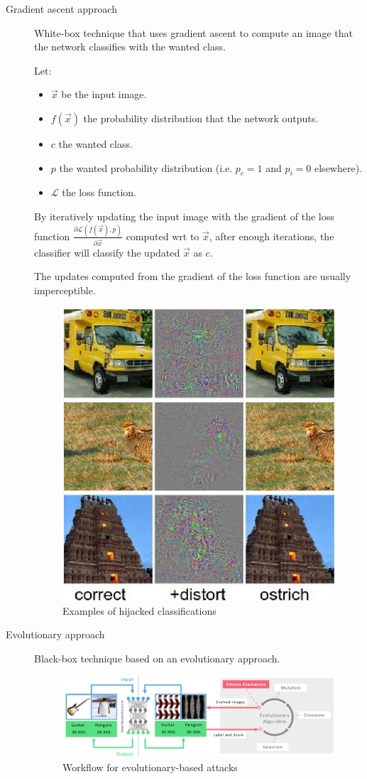 \begin{description}
    \item[Gradient ascent approach]
        White-box technique that uses gradient ascent to compute an image that the network classifies with the wanted class.

        Let:
        \begin{itemize}
            \item $\vec{x}$ be the input image.
            \item $f(\vec{x})$ the probability distribution that the network outputs.
            \item $c$ the wanted class.
            \item $p$ the wanted probability distribution (i.e. $p_c = 1$ and $p_i = 0$ elsewhere).
            \item $\mathcal{L}$ the loss function.
        \end{itemize}

        By iteratively updating the input image with the gradient of the loss function $\frac{\partial\mathcal{L}(f(\vec{x}), p)}{\partial\vec{x}}$ 
        computed wrt to $\vec{x}$,
        after enough iterations, the classifier will classify the updated $\vec{x}$ as $c$.

        \begin{remark}
            The updates computed from the gradient of the loss function are usually imperceptible.
        \end{remark}

        \begin{figure}[H]
            \centering
            \includegraphics[width=0.25\linewidth]{./img/fooling_nn.png}
            \caption{Examples of hijacked classifications}
        \end{figure}

    \item[Evolutionary approach]
        Black-box technique based on an evolutionary approach.

        \begin{figure}[H]
            \centering
            \includegraphics[width=0.8\linewidth]{./img/fooling_evolutionary.png}
            \caption{Workflow for evolutionary-based attacks}
        \end{figure}
\end{description}


